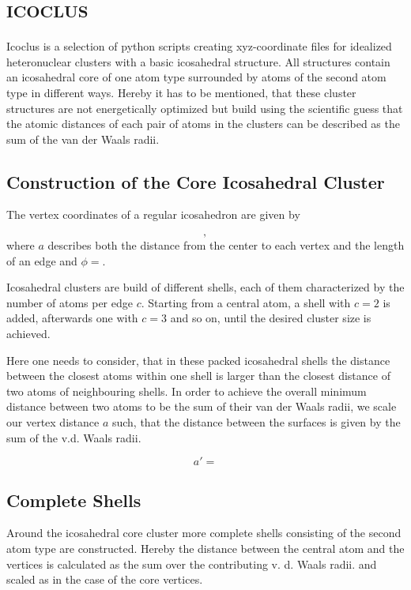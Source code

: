\section{\textsc{icoclus}}

Icoclus is a selection of python scripts creating xyz-coordinate
files for idealized heteronuclear clusters with a basic
icosahedral structure.
All structures contain an icosahedral core of one atom type
surrounded by atoms of the second atom type in different ways.
Hereby it has to be mentioned, that these cluster structures are not
energetically optimized but build using the scientific guess
that the atomic distances of each pair of atoms in the clusters
can be described as the sum of the van der Waals
radii.

\subsection{Construction of the Core Icosahedral Cluster}
The vertex coordinates of a regular icosahedron are given by

\begin{equation}
 ,
\end{equation}
where $a$ describes both the distance from the center to each vertex
and the length of an edge and $\phi =$.

Icosahedral clusters are build of different shells, each of them
characterized by the number of atoms per edge $c$. Starting from a
central atom, a shell with $c=2$ is added, afterwards one with $c=3$
and so on, until the desired cluster size is achieved.

Here one needs to consider, that in these packed icosahedral shells
the distance between the closest atoms within one shell is
larger than the closest distance of two atoms of neighbouring shells.
In order to achieve the overall minimum distance between two atoms
to be the sum of their van der Waals radii, we scale our vertex
distance $a$ such, that the distance between the surfaces is given by
the sum of the v.d. Waals radii.

\begin{equation}
 a' =
\end{equation}

\subsection{Complete Shells}
Around the icosahedral core cluster more complete shells consisting
of the second atom type are constructed. Hereby the distance between
the central atom and the vertices is calculated as the sum over the
contributing v. d. Waals radii. and scaled as in the case of the core
vertices.

